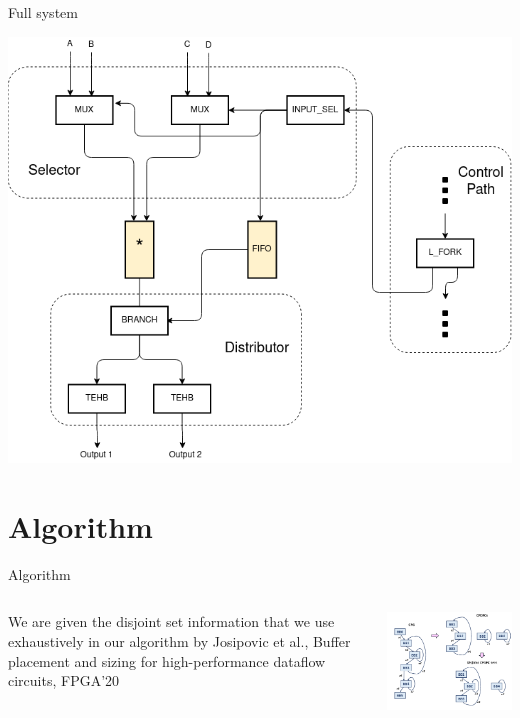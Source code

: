 \documentclass{beamer}
\begin{document}
\begin{frame}{Full system}
\begin{center}
\includegraphics[scale=0.3]{full_example.png}
\end{center}
\end{frame}

\section{Algorithm}
\begin{frame}{Algorithm}
\begin{columns}

\end{columns}
    \begin{columns}[T]
    \begin{column}{0.45\textwidth}
We are given the disjoint set information that we use exhaustively in our algorithm by Josipovic et al., Buffer placement and sizing for high-performance dataflow circuits, FPGA'20
\end{column}
    \begin{column}{0.45\textwidth}
    \begin{center}
     \includegraphics[scale=0.4]{input_algorithm.png}
    \end{center}
    \end{column}
\end{columns}
\end{frame}
\end{document}
